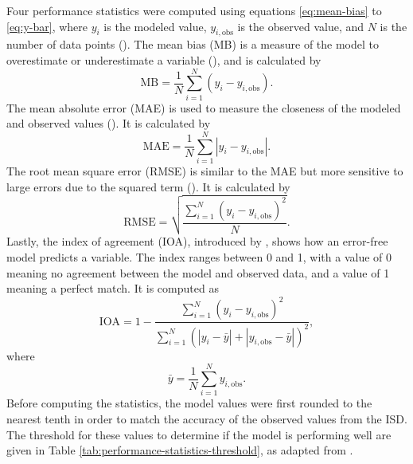 	Four performance statistics were computed using equations \ref{eq:mean-bias} to \ref{eq:y-bar},
		where $y_i$ is the modeled value, $y_{i,\text{obs}}$ is the observed value, and $N$ is the number of data points (\cite{Bilang2022}).
	The mean bias (MB) is a measure of the model to overestimate or underestimate a variable (\cite{Carbonell2013}), and is calculated by
	\begin{equation}
		\text{MB} =
			\frac{1}{N}
			\sum_{i=1}^{N}
			(y_i - y_{i,\text{obs}}).
			\label{eq:mean-bias}
	\end{equation}
	The mean absolute error (MAE) is used to measure the closeness of the modeled and observed values (\cite{Arasa2016}).
	It is calculated by
	\begin{equation}
		\text{MAE} =
			\frac{1}{N}
			\sum_{i=1}^{N} 
			|y_i - y_{i,\text{obs}}|. \label{eq:mean-absolute-error}
	\end{equation}
	The root mean square error (RMSE) is similar to the MAE but more sensitive to large errors due to the squared term (\cite{Carbonell2013}).
	It is calculated by
	\begin{equation}
		\text{RMSE} =
		\sqrt{
			\frac{
				\sum_{i=1}^{N}
				(y_i - y_{i,\text{obs}}) ^ 2
			}{N}
		}.
		\label{eq:root-mean-square-error}
	\end{equation}
	Lastly, the index of agreement (IOA), introduced by \textcite{Willmott1980}, shows how an error-free model predicts a variable.
	The index ranges between \num{0} and \num{1},
		with a value of \num{0} meaning no agreement between the model and observed data,
		and a value of \num{1} meaning a perfect match. 
	It is computed as
	\begin{equation}
		\text{IOA} =
			1 - 
			\frac{
				\sum_{i=1}^{N}
				(y_i - y_{i,\text{obs}}) ^ 2
			}{
				\sum_{i=1}^{N} (
					|y_i - \bar{y}| +
					|y_{i,\text{obs}} - \bar{y}|
				)^2
			},
			\label{eq:index-of-agreement}
	\end{equation}
	where
	\begin{equation}
		\bar{y} = 
			\frac{1}{N}
			\sum_{i=1}^{N} y_{i,\text{obs}}.
			\label{eq:y-bar}
	\end{equation}
	Before computing the statistics, the model values were first rounded to the nearest tenth in order to match the accuracy of the observed values from the ISD.
	The threshold for these values to determine if the model is performing well are given in Table \ref{tab:performance-statistics-threshold}, as adapted from \textcite{Bilang2022}.

